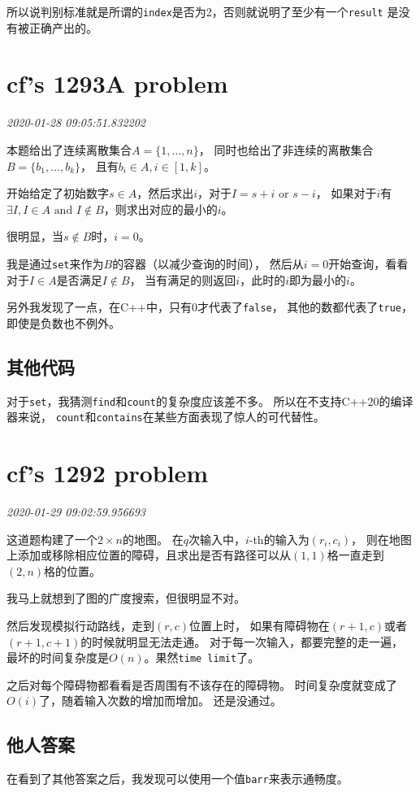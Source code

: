 \documentclass{peterlitsdoc}
\newcommand{\timetx}[1]
    {\par\noindent\emph{\pltgray\small #1}\vspace{2em}}
\newcommand{\vb}{\verb}
\begin{document}
所以说判别标准就是所谓的\vb|index|是否为2，否则就说明了至少有一个\vb|result|
是没有被正确产出的。


\section{cf's 1293A problem}\timetx{2020-01-28 09:05:51.832202}

本题给出了连续离散集合$A=\{1, \ldots, n\}$，
同时也给出了非连续的离散集合$B=\{b_1, \ldots, b_k\}$，
且有$b_i\in A, i\in [1, k]$。

开始给定了初始数字$s\in A$，然后求出$i$，对于$I=s+i\text{ or }s-i$，
如果对于$i$有$\exists I, I\in A\text{ and } I\notin B$，则求出对应的最小的$i$。

很明显，当$s\notin B$时，$i=0$。

我是通过\vb|set|来作为$B$的容器（以减少查询的时间），
然后从$i = 0$开始查询，看看对于$I\in A$是否满足$I\notin B$，
当有满足的则返回$i$，此时的$i$即为最小的$i$。

另外我发现了一点，在C++中，只有0才代表了\vb|false|，
其他的数都代表了\vb|true|，即使是负数也不例外。

\subsection{其他代码}
对于\vb|set|，我猜测\vb|find|和\vb|count|的复杂度应该差不多。
所以在不支持C++20的编译器来说，
\vb|count|和\vb|contains|在某些方面表现了惊人的可代替性。


\section{cf's 1292 problem}\timetx{2020-01-29 09:02:59.956693}

这道题构建了一个$2\times n$的地图。
在$q$次输入中，$i$-th的输入为$(r_i, c_i)$，
则在地图上添加或移除相应位置的障碍，且求出是否有路径可以从$(1, 1)$格一直走到
$(2, n)$格的位置。

我马上就想到了图的广度搜索，但很明显不对。

然后发现模拟行动路线，走到$(r, c)$位置上时，
如果有障碍物在$(r+1, c)$或者$(r+1, c+1)$的时候就明显无法走通。
对于每一次输入，都要完整的走一遍，
最坏的时间复杂度是$O(n)$。果然\vb|time limit|了。

之后对每个障碍物都看看是否周围有不该存在的障碍物。
时间复杂度就变成了$O(i)$了，随着输入次数的增加而增加。
还是没通过。

\subsection{他人答案}
在看到了其他答案之后，我发现可以使用一个值\vb|barr|来表示通畅度。
\end{document}

